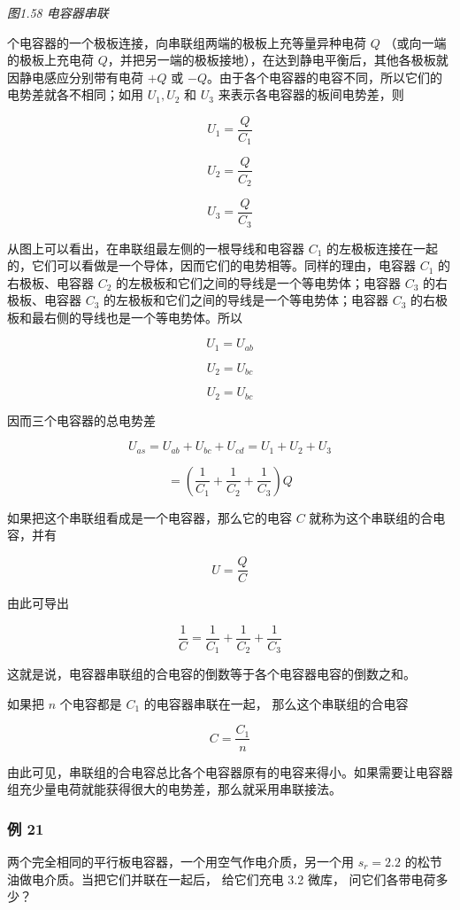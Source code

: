 \emph{图1.58 电容器串联}

个电容器的一个极板连接，向串联组两端的极板上充等量异种电荷 \(Q\)
（或向一端的极板上充电荷
\(Q\)，并把另一端的极板接地），在达到静电平衡后，其他各极板就因静电感应分别带有电荷
\(+Q\) 或
\(-Q\)。由于各个电容器的电容不同，所以它们的电势差就各不相同；如用
\(U_{1}, U_{2}\) 和 \(U_{3}\) 来表示各电容器的板间电势差，则

\[
U_{1} = \frac{Q}{C_{1}}
\]

\[
U_{2} = \frac{Q}{C_{2}}
\]

\[
U_{3} = \frac{Q}{C_{3}}
\]

从图上可以看出，在串联组最左侧的一根导线和电容器 \(C_1\)
的左极板连接在一起的，它们可以看做是一个导体，因而它们的电势相等。同样的理由，电容器
\(C_1\) 的右极板、电容器 \(C_2\)
的左极板和它们之间的导线是一个等电势体；电容器 \(C_3\) 的右极板、电容器
\(C_3\) 的左极板和它们之间的导线是一个等电势体；电容器 \(C_3\)
的右极板和最右侧的导线也是一个等电势体。所以

\[
U_{1}=U_{ab}
\]

\[
U_{2}=U_{bc}
\]

\[
U_{2}=U_{bc}
\]

因而三个电容器的总电势差

\[
U_{a s} = U_{a b} + U_{b c} + U_{c d} = U_{1} + U_{2} + U_{3}
\]

\[
= \left(\frac{1}{C_{1}} + \frac{1}{C_{2}} + \frac{1}{C_{3}}\right) Q
\]

如果把这个串联组看成是一个电容器，那么它的电容 \(C\)
就称为这个串联组的合电容，并有

\[
U=\frac{Q}{C}
\]

由此可导出

\[
\frac{1}{C} = \frac{1}{C_{1}} + \frac{1}{C_{2}} + \frac{1}{C_{3}} \tag{1.36}
\]

这就是说，电容器串联组的合电容的倒数等于各个电容器电容的倒数之和。

如果把 \(n\) 个电容都是 \(C_1\) 的电容器串联在一起，
那么这个串联组的合电容

\[
C=\frac{C_{1}}{n} \tag{1.37}
\]

由此可见，串联组的合电容总比各个电容器原有的电容来得小。如果需要让电容器组充少量电荷就能获得很大的电势差，那么就采用串联接法。

\subsubsection{例 21}\label{ux4f8b-21}

两个完全相同的平行板电容器，一个用空气作电介质，另一个用 \(s_r = 2.2\)
的松节油做电介质。当把它们并联在一起后， 给它们充电 3.2 微库，
问它们各带电荷多少？

